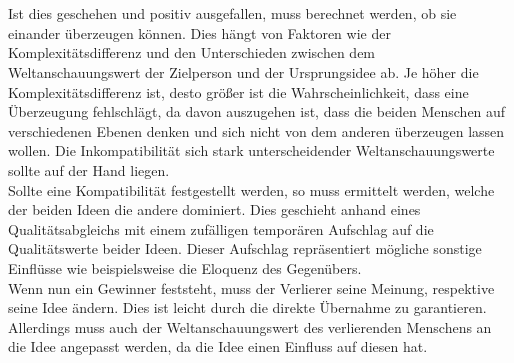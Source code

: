 \quad \\ \quad \\
Ist dies geschehen und positiv ausgefallen, muss berechnet werden, ob sie einander überzeugen können.
Dies hängt von Faktoren wie der Komplexitätsdifferenz und den Unterschieden zwischen dem Weltanschauungswert der Zielperson und der Ursprungsidee ab. Je höher die Komplexitätsdifferenz ist, desto größer ist die Wahrscheinlichkeit, dass eine Überzeugung fehlschlägt, da davon auszugehen ist, dass die beiden Menschen auf verschiedenen Ebenen denken und sich nicht von dem anderen überzeugen lassen wollen. Die Inkompatibilität sich stark unterscheidender Weltanschauungswerte sollte auf der Hand liegen. \\
Sollte eine Kompatibilität festgestellt werden, so muss ermittelt werden, welche der beiden Ideen die andere dominiert. Dies geschieht anhand eines Qualitätsabgleichs mit einem zufälligen temporären Aufschlag auf die Qualitätswerte beider Ideen. Dieser Aufschlag repräsentiert mögliche sonstige Einflüsse wie beispielsweise die Eloquenz des Gegenübers. \\
Wenn nun ein Gewinner feststeht, muss der Verlierer seine Meinung, respektive seine Idee ändern. Dies ist leicht durch die direkte Übernahme zu garantieren. Allerdings muss auch der Weltanschauungswert des verlierenden Menschens an die Idee angepasst werden, da die Idee einen Einfluss auf diesen hat. \\

